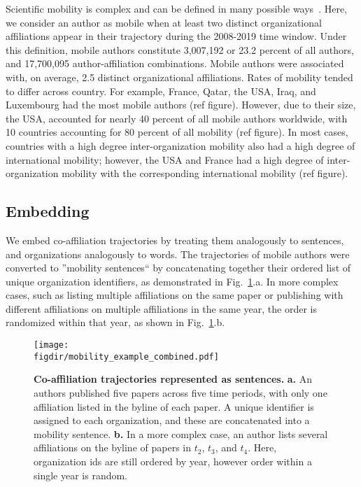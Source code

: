 \documentclass[12pt]{article} %
\def\figdir{../Figs}
\begin{document}
Scientific mobility is complex and can be defined in many possible ways~\autocite{robinson2019mobility}.
Here, we consider an author as mobile when at least two distinct organizational affiliations appear in their trajectory during the 2008-2019 time window. 
Under this definition, mobile authors constitute 3,007,192 or 23.2 percent of all authors, and 17,700,095 author-affiliation combinations. 
Mobile authors were associated with, on average, 2.5 distinct organizational affiliations. 
Rates of mobility tended to differ across country. 
For example, France, Qatar, the USA, Iraq, and Luxembourg had the most mobile authors (ref figure).
However, due to their size, the USA, accounted for nearly 40 percent of all mobile authors worldwide, with  10 countries accounting for 80 percent of all mobility (ref figure).
In most cases, countries with a high degree inter-organization mobility also had a high degree of international mobility;
however, the USA and France had a high degree of inter-organization mobility with the corresponding international mobility (ref figure). 


\subsection*{Embedding}
We embed co-affiliation trajectories by treating them analogously to sentences, and organizations analogously to words. 
The trajectories of mobile authors were converted to ''mobility sentences`` by concatenating together their ordered list of unique organization identifiers, as demonstrated in Fig.~\ref{fig:methods:mobility_sentence}.a.
In more complex cases, such as listing multiple affiliations on the same paper or publishing with different affiliations on multiple affiliations in the same year, the order is randomized within that year, as shown in  Fig.~\ref{fig:methods:mobility_sentence}.b. 

%
%
\begin{figure}[ht!]
	\centering
	\texttt{[image: \\figdir/mobility\_example\_combined.pdf]}
	\caption{
		\textbf{Co-affiliation trajectories represented as sentences.}
		\textbf{a.} 
		An authors published five papers across five time periods, with only one affiliation listed in the byline of each paper. 
		A unique identifier is assigned to each organization, and these are concatenated into a mobility sentence. 
		\textbf{b.}
		In a more complex case, an author lists several affiliations on the byline of papers in $t_{2}$, $t_{3}$, and $t_{4}$. Here, organization ids are still ordered by year, however order within a single year is random.  	
	}
	\label{fig:methods:mobility_sentence}
\end{figure}
\end{document}
